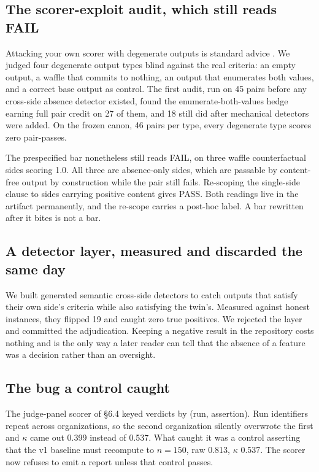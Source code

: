 \documentclass[11pt]{article}
\begin{document}
\subsection{The scorer-exploit audit, which still reads FAIL}

Attacking your own scorer with degenerate outputs is standard advice
\cite{abc}. We judged four degenerate output types blind against the real
criteria: an empty output, a waffle that commits to nothing, an output that
enumerates both values, and a correct base output as control. The first audit,
run on 45 pairs before any cross-side absence detector existed, found the
enumerate-both-values hedge earning full pair credit on 27 of them, and 18 still
did after mechanical detectors were added. On the frozen canon, 46 pairs per
type, every degenerate type scores zero pair-passes.

The prespecified bar nonetheless still reads FAIL, on three waffle
counterfactual sides scoring 1.0. All three are absence-only sides, which are
passable by content-free output by construction while the pair still fails.
Re-scoping the single-side clause to sides carrying positive content gives
PASS. Both readings live in the artifact permanently, and the re-scope carries
a post-hoc label. A bar rewritten after it bites is not a bar.

\subsection{A detector layer, measured and discarded the same day}

We built generated semantic cross-side detectors to catch outputs that satisfy
their own side's criteria while also satisfying the twin's. Measured against
honest instances, they flipped 19 and caught zero true positives. We rejected
the layer and committed the adjudication. Keeping a negative result in the
repository costs nothing and is the only way a later reader can tell that the
absence of a feature was a decision rather than an oversight.

\subsection{The bug a control caught}

The judge-panel scorer of \S6.4 keyed verdicts by (run, assertion). Run
identifiers repeat across organizations, so the second organization silently
overwrote the first and $\kappa$ came out 0.399 instead of 0.537. What caught
it was a control asserting that the v1 baseline must recompute to $n=150$, raw
0.813, $\kappa$ 0.537. The scorer now refuses to emit a report unless that
control passes.
\end{document}
